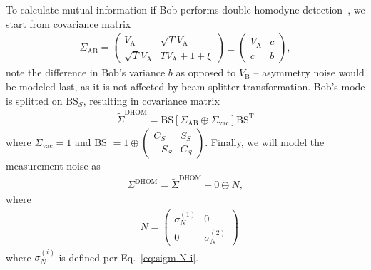 \documentclass[%
reprint,
superscriptaddress,
 amsmath,amssymb,amsfonts,
 aps,
 pra,
 longbibliography
]{revtex4-2}
\newcommand{\ind}[1]{\mathrm{#1}}
\begin{document}
To calculate mutual information if Bob performs double homodyne 
detection~\cite{PhysRevLett.93.170504}, we start from covariance matrix 
\begin{align}
  \label{eq:sigma_ab_nonoise}
\Sigma_{\ind{AB}}=\begin{pmatrix}
        V_{\ind{A}}&\sqrt TV_{\ind{A}}\\
        \sqrt TV_{\ind{A}}&TV_{\ind{A}}+1+\xi
    \end{pmatrix}\equiv \begin{pmatrix}
    V_{\ind{A}}&c\\
        c&b
    \end{pmatrix}
    ,
\end{align}
note the difference in Bob's variance $b$ as opposed to $V_{\ind{B}}$ -- asymmetry noise would be 
modeled last, as it is not affected by beam splitter transformation.
Bob's mode is splitted on BS$_S$, resulting in covariance matrix
\begin{align}
    \label{eq:tilde-sigma}
    \tilde\Sigma^{\ind{DHOM}}=\ind{BS}\left[\Sigma_{\ind {AB}}
    \oplus \Sigma_{\ind{\ind{vac}}}\right]\ind{BS}^{\ind{T}}
\end{align}
where $\Sigma_{\ind{\ind{vac}}}=1$ and BS $=1\oplus    
\begin{pmatrix}
    C_S& S_S\\
    -S_S&C_S
\end{pmatrix}$.
Finally, we will model the measurement noise as
\begin{align}
  \label{eq:sigma_ab_dhom}
    \Sigma^{\ind{DHOM}}=
    \tilde\Sigma^{\ind{DHOM}}+0\oplus N,
\end{align}
where
\begin{align}
\label{eq:N}
    &N=\begin{pmatrix}
        \sigma_N^{(1)}&0\\
        0&\sigma_N^{(2)}
    \end{pmatrix}
\end{align}
where $\sigma_N^{(i)}$ is defined per Eq.~\eqref{eq:sigm-N-i}. 
\end{document}
